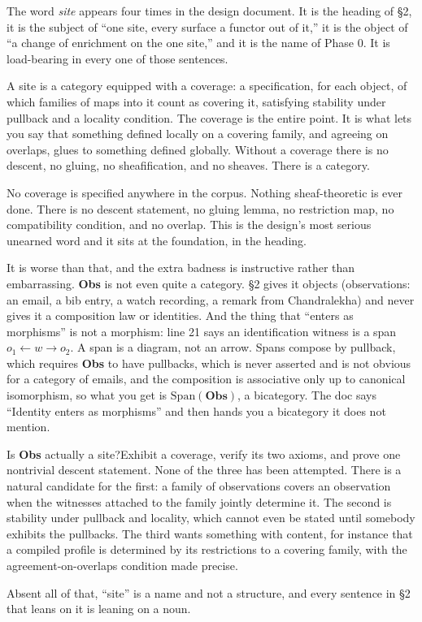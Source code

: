 The word \emph{site} appears four times in the design document. It is the heading of \S2, it is the subject of ``one site, every surface a functor out of it,'' it is the object of ``a change of enrichment on the one site,'' and it is the name of Phase 0. It is load-bearing in every one of those sentences.

A site is a category equipped with a coverage: a specification, for each object, of which families of maps into it count as covering it, satisfying stability under pullback and a locality condition. The coverage is the entire point. It is what lets you say that something defined locally on a covering family, and agreeing on overlaps, glues to something defined globally. Without a coverage there is no descent, no gluing, no sheafification, and no sheaves. There is a category.

No coverage is specified anywhere in the corpus. Nothing sheaf-theoretic is ever done. There is no descent statement, no gluing lemma, no restriction map, no compatibility condition, and no overlap. This is the design's most serious unearned word and it sits at the foundation, in the heading.

It is worse than that, and the extra badness is instructive rather than embarrassing. \textbf{Obs} is not even quite a category. \S2 gives it objects (observations: an email, a bib entry, a watch recording, a remark from Chandralekha) and never gives it a composition law or identities. And the thing that ``enters as morphisms'' is not a morphism: line 21 says an identification witness is a span $o_1 \leftarrow w \to o_2$. A span is a diagram, not an arrow. Spans compose by pullback, which requires \textbf{Obs} to have pullbacks, which is never asserted and is not obvious for a category of emails, and the composition is associative only up to canonical isomorphism, so what you get is $\mathrm{Span}(\mathbf{Obs})$, a bicategory. The doc says ``Identity enters as morphisms'' and then hands you a bicategory it does not mention.

\begin{Open}{Is \textbf{Obs} actually a site?}{Exhibit a coverage, verify its two axioms, and prove one nontrivial descent statement.}
None of the three has been attempted. There is a natural candidate for the first: a family of observations covers an observation when the witnesses attached to the family jointly determine it. The second is stability under pullback and locality, which cannot even be stated until somebody exhibits the pullbacks. The third wants something with content, for instance that a compiled profile is determined by its restrictions to a covering family, with the agreement-on-overlaps condition made precise.

Absent all of that, ``site'' is a name and not a structure, and every sentence in \S2 that leans on it is leaning on a noun.
\end{Open}

